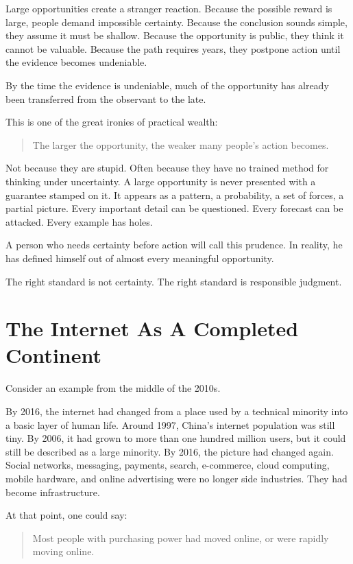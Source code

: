Large opportunities create a stranger reaction. Because the possible reward is large, people demand impossible certainty. Because the conclusion sounds simple, they assume it must be shallow. Because the opportunity is public, they think it cannot be valuable. Because the path requires years, they postpone action until the evidence becomes undeniable.

By the time the evidence is undeniable, much of the opportunity has already been transferred from the observant to the late.

This is one of the great ironies of practical wealth:

\begin{quote}
The larger the opportunity, the weaker many people's action becomes.
\end{quote}

Not because they are stupid. Often because they have no trained method for thinking under uncertainty. A large opportunity is never presented with a guarantee stamped on it. It appears as a pattern, a probability, a set of forces, a partial picture. Every important detail can be questioned. Every forecast can be attacked. Every example has holes.

A person who needs certainty before action will call this prudence. In reality, he has defined himself out of almost every meaningful opportunity.

The right standard is not certainty. The right standard is responsible judgment.

\section*{The Internet As A Completed Continent}

Consider an example from the middle of the 2010s.

By 2016, the internet had changed from a place used by a technical minority into a basic layer of human life. Around 1997, China's internet population was still tiny. By 2006, it had grown to more than one hundred million users, but it could still be described as a large minority. By 2016, the picture had changed again. Social networks, messaging, payments, search, e-commerce, cloud computing, mobile hardware, and online advertising were no longer side industries. They had become infrastructure.

At that point, one could say:

\begin{quote}
Most people with purchasing power had moved online, or were rapidly moving online.
\end{quote}

